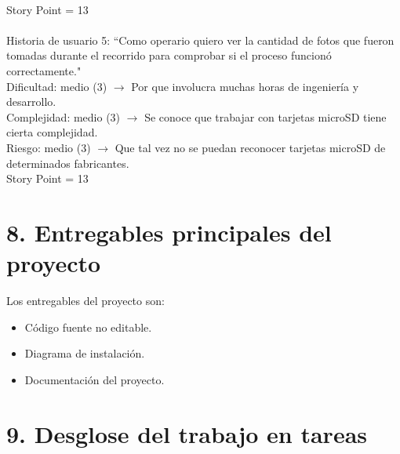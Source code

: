 \documentclass[
11pt, %
]{charter}
\begin{document}
\\
Story Point = 13
\\
\\
Historia de usuario 5: “Como operario quiero ver la cantidad de fotos que fueron tomadas durante el recorrido para comprobar si el proceso funcionó correctamente."
\\
Dificultad: medio (3) $\rightarrow$ Por que involucra muchas horas de ingeniería y desarrollo.
\\
Complejidad: medio (3) $\rightarrow$ Se conoce que trabajar con tarjetas microSD tiene cierta complejidad.
\\
Riesgo: medio (3) $\rightarrow$ Que tal vez no se puedan reconocer tarjetas microSD de determinados fabricantes.
\\
Story Point = 13


\section{8. Entregables principales del proyecto}
\label{sec:entregables}

Los entregables del proyecto son:

\begin{itemize}
	\item Código fuente no editable.
	\item Diagrama de instalación.
	\item Documentación del proyecto.
\end{itemize}


\section{9. Desglose del trabajo en tareas}
\label{sec:wbs}
\end{document}
